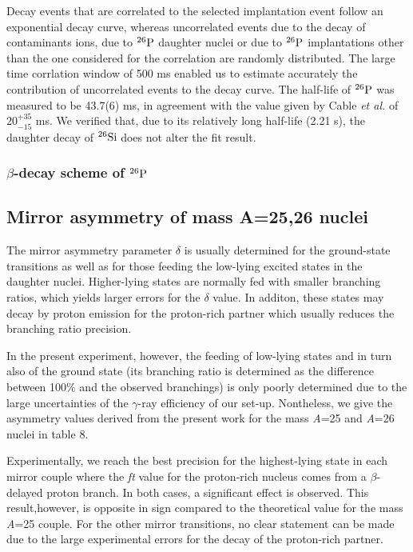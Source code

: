 \documentclass[UTF8]{ctexart}
\begin{document}
Decay events that are correlated to the selected implantation event follow an exponential decay curve, whereas uncorrelated events due to the decay of contaminants ions, due to $^{26}\textnormal{P}$ daughter nuclei or due to $^{26}\textnormal{P}$ implantations other than the one considered for the correlation are randomly distributed. The large time corrlation window of 500 ms enabled us to estimate accurately the contribution of uncorrelated events to the decay curve. The half-life of $^{26}\textnormal{P}$ was measured to be 43.7(6) ms, in agreement with the value given by Cable \textit{et al.} of $20_{-15}^{+35}$ ms. We verified that, due to its relatively long half-life (2.21 s), the daughter decay of $^{26}\textnormal{Si}$ does not alter the fit result.


\subsubsection{$\beta$-decay scheme of $^{26}\textnormal{P}$}
\subsection{Mirror asymmetry of mass A=25,26 nuclei}
The mirror asymmetry parameter $\delta$ is usually determined for the ground-state transitions as well as for those feeding the low-lying excited states in the daughter nuclei. Higher-lying states are normally fed with smaller branching ratios, which yields larger errors for the $\delta$ value. In additon, these states may decay by proton emission for the proton-rich partner which usually reduces the branching ratio precision.

In the present experiment, however, the feeding of low-lying states and in turn also of the ground state (its branching ratio is determined as the difference between 100\% and the observed branchings) is only poorly determined due to the large uncertainties of the $\gamma$-ray efficiency of our set-up. Nontheless, we give the asymmetry values derived from the present work for the mass \textit{A}=25 and \textit{A}=26 nuclei in table 8.

Experimentally, we reach the best precision for the highest-lying state in each mirror couple where the \textit{ft} value for the proton-rich nucleus comes from a $\beta$-delayed proton branch. In both cases, a significant effect is observed. This result,however, is opposite in sign compared to the theoretical value for the mass \textit{A}=25 couple. For the other mirror transitions, no clear statement can be made due to the large experimental errors for the decay of the proton-rich partner.
\end{document}
